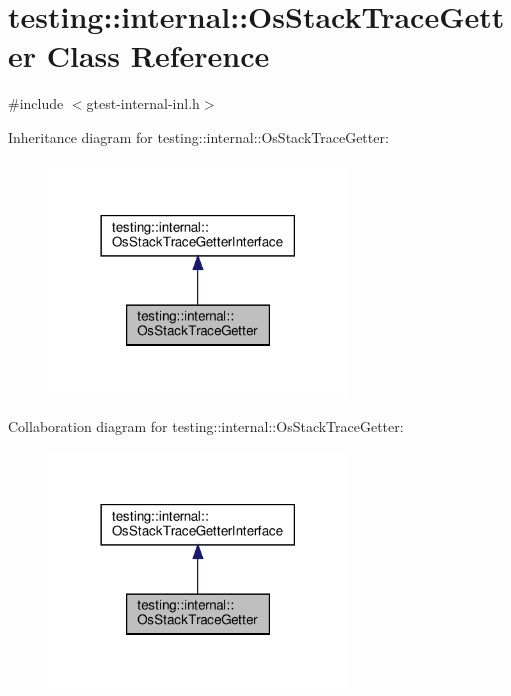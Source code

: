 \hypertarget{classtesting_1_1internal_1_1_os_stack_trace_getter}{}\section{testing\+:\+:internal\+:\+:Os\+Stack\+Trace\+Getter Class Reference}
\label{classtesting_1_1internal_1_1_os_stack_trace_getter}


{\ttfamily \#include $<$gtest-\/internal-\/inl.\+h$>$}



Inheritance diagram for testing\+:\+:internal\+:\+:Os\+Stack\+Trace\+Getter\+:
\nopagebreak
\begin{figure}[H]
\begin{center}
\leavevmode
\includegraphics[width=225pt]{classtesting_1_1internal_1_1_os_stack_trace_getter__inherit__graph}
\end{center}
\end{figure}


Collaboration diagram for testing\+:\+:internal\+:\+:Os\+Stack\+Trace\+Getter\+:
\nopagebreak
\begin{figure}[H]
\begin{center}
\leavevmode
\includegraphics[width=225pt]{classtesting_1_1internal_1_1_os_stack_trace_getter__coll__graph}
\end{center}
\end{figure}
